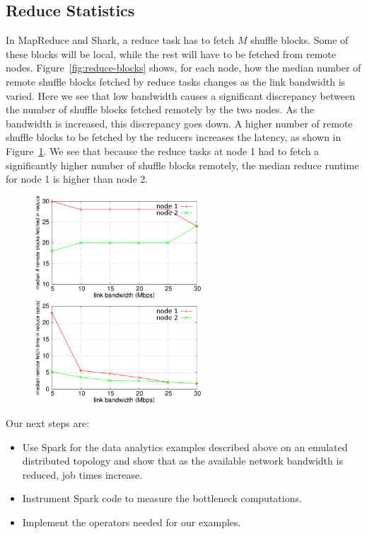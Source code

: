 \subsection{Reduce Statistics}

In MapReduce and Shark, a reduce task has to fetch $M$ shuffle blocks. Some of these blocks will be local, while the rest will have to be fetched from remote nodes.  Figure~\ref{fig:reduce-blocks} shows, for each node, how the median number of remote shuffle blocks fetched by reduce tasks changes as the link bandwidth is varied. Here we see that low bandwidth causes a significant discrepancy between the number of shuffle blocks fetched remotely by the two nodes. As the bandwidth is increased, this discrepancy goes down. A higher number of remote shuffle blocks to be fetched by the reducers increases the latency, as shown in Figure~\ref{fig:reduce-time}. We see that because the reduce tasks at node 1 had to fetch a significantly higher number of shuffle blocks remotely, the median reduce runtime for node 1 is higher than node 2.   

\begin{figure}[ht]
	\centering
	\begin{minipage}[b]{0.48\linewidth}
		\includegraphics[width=2.5in]{figs/reduce-blocks.pdf}
		\caption{}
		\label{fig:reduce-blocks}
	\end{minipage}
	\quad
	\begin{minipage}[b]{0.48\linewidth}
		\includegraphics[width=2.5in]{figs/reduce-time.pdf}
		\caption{}
		\label{fig:reduce-time}
	\end{minipage}
\end{figure}



Our next steps are:
\begin{itemize}
\item Use Spark for the data analytics examples described above on an emulated distributed topology and show that as the available network bandwidth is reduced, job times increase.
\item Instrument Spark code to measure the bottleneck computations.
\item Implement the operators needed for our examples.
\end{itemize}

